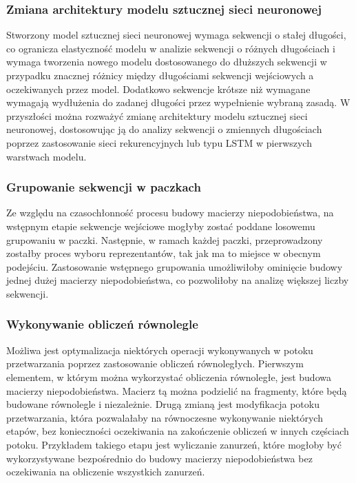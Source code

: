 \documentclass{article}
\newcommand{\temporary}[1]{
    \begin{tcolorbox}[colframe=red, colback=white, title={\textbf{WERSJA PO POLSKU}}, sharp corners=south]
        #1
    \end{tcolorbox}
}
\begin{document}
            \temporary{
                \subsubsection{Zmiana architektury modelu sztucznej sieci neuronowej}

            Stworzony model sztucznej sieci neuronowej wymaga sekwencji o stałej długości, co ogranicza elastyczność modelu w analizie sekwencji o różnych długościach i wymaga tworzenia nowego modelu dostosowanego do dłuższych sekwencji w przypadku znacznej różnicy między długościami sekwencji wejściowych a oczekiwanych przez model. Dodatkowo sekwencje krótsze niż wymagane wymagają wydłużenia do zadanej długości przez wypełnienie wybraną zasadą. W przyszłości można rozważyć zmianę architektury modelu sztucznej sieci neuronowej, dostosowując ją do analizy sekwencji o zmiennych długościach poprzez zastosowanie sieci rekurencyjnych lub typu LSTM w pierwszych warstwach modelu.

        \subsubsection{Grupowanie sekwencji w paczkach}

            Ze względu na czasochłonność procesu budowy macierzy niepodobieństwa, na wstęp\-nym etapie sekwencje wejściowe mogłyby zostać poddane losowemu grupowaniu w paczki. Następnie, w ramach każdej paczki, przeprowadzony zostałby proces wyboru reprezentantów, tak jak ma to miejsce w obecnym podejściu. Zastosowanie wstępnego grupowania umożliwiłoby ominięcie budowy jednej dużej macierzy niepodobieństwa, co pozwoliłoby na analizę większej liczby sekwencji.

        \subsubsection{Wykonywanie obliczeń równolegle}

            Możliwa jest optymalizacja niektórych operacji wykonywanych w potoku przetwarzania poprzez zastosowanie obliczeń równoległych. Pierwszym elementem, w którym można wykorzystać obliczenia równoległe, jest budowa macierzy niepodobieństwa. Macierz tą można podzielić na fragmenty, które będą budowane równolegle i niezależnie. Drugą zmianą jest modyfikacja potoku przetwarzania, która pozwalałaby na równoczesne wykonywanie niektórych etapów, bez konieczności oczekiwania na zakończenie obliczeń w innych częściach potoku. Przykładem takiego etapu jest wyliczanie zanurzeń, które mogłoby być wykorzystywane bezpośrednio do budowy macierzy niepodobieństwa bez oczekiwania na obliczenie wszystkich zanurzeń.

}
\end{document}
